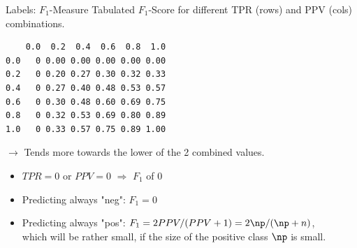 \documentclass[11pt,compress,t,notes=noshow, xcolor=table]{beamer}
\makeatletter
\newenvironment{kframe}{%
 \def\at@end@of@kframe{}%
 \ifinner\ifhmode%
  \def\at@end@of@kframe{\end{minipage}}%
  \begin{minipage}{\columnwidth}%
 \fi\fi%
 \def\FrameCommand##1{\hskip\@totalleftmargin \hskip-\fboxsep
 \colorbox{shadecolor}{##1}\hskip-\fboxsep
     \hskip-\linewidth \hskip-\@totalleftmargin \hskip\columnwidth}%
 \MakeFramed {\advance\hsize-\width
   \@totalleftmargin\z@ \linewidth\hsize
   \@setminipage}}%
 {\par\unskip\endMakeFramed%
 \at@end@of@kframe}
\newenvironment{knitrout}{}{} %
\makeatother
\begin{document}
\begin{vbframe}{Labels: $F_1$-Measure}
Tabulated $F_1$-Score for different TPR (rows) and PPV (cols) combinations.
\begin{knitrout}\scriptsize
{}\color{fgcolor}\begin{kframe}
\begin{verbatim}
    0.0  0.2  0.4  0.6  0.8  1.0
0.0   0 0.00 0.00 0.00 0.00 0.00
0.2   0 0.20 0.27 0.30 0.32 0.33
0.4   0 0.27 0.40 0.48 0.53 0.57
0.6   0 0.30 0.48 0.60 0.69 0.75
0.8   0 0.32 0.53 0.69 0.80 0.89
1.0   0 0.33 0.57 0.75 0.89 1.00
\end{verbatim}
\end{kframe}
\end{knitrout}
$\rightarrow$ Tends more towards the lower of the 2 combined values.


\begin{itemize}
  \item $TPR = 0$ or $PPV=0$ $\Rightarrow$ $F_1$ of 0
  \item Predicting always "neg": $F_1 = 0$
  \item Predicting always "pos": $F_1 = 2 PPV / (PPV + 1) = 2 \np / (\np + n)$,\\
  which will be rather small, if the size of the positive class $\np$ is small.
\end{itemize}


\end{vbframe}

\endlecture
\end{document}
